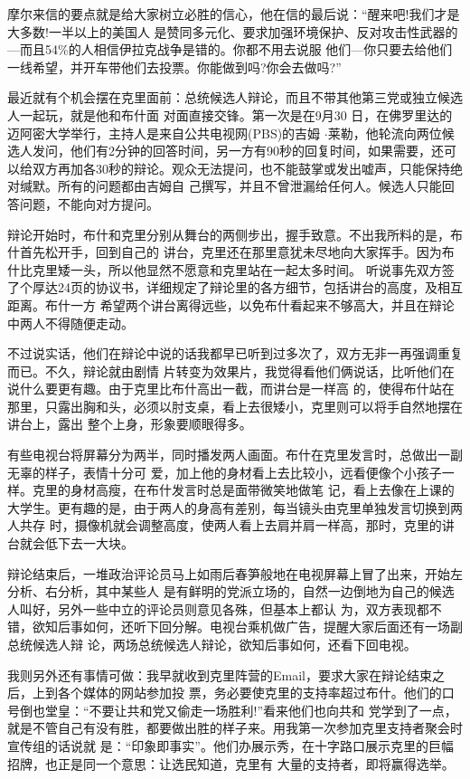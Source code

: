 ﻿\documentclass[11pt]{article}
\begin{document}
摩尔来信的要点就是给大家树立必胜的信心，他在信的最后说：``醒来吧!我们才是大多数!一半以上的美国人
是赞同多元化、要求加强环境保护、反对攻击性武器的---而且54\%的人相信伊拉克战争是错的。你都不用去说服
他们---你只要去给他们一线希望，并开车带他们去投票。你能做到吗?你会去做吗?''

最近就有个机会摆在克里面前：总统候选人辩论，而且不带其他第三党或独立候选人一起玩，就是他和布什面
对面直接交锋。第一次是在9月30 日，在佛罗里达的迈阿密大学举行，主持人是来自公共电视网(PBS)的吉姆
$\cdot$莱勒，他轮流向两位候选人发问，他们有2分钟的回答时间，另一方有90秒的回复时间，如果需要，还可
以给双方再加各30秒的辩论。观众无法提问，也不能鼓掌或发出嘘声，只能保持绝对缄默。所有的问题都由吉姆自
己撰写，并且不曾泄漏给任何人。候选人只能回答问题，不能向对方提问。

辩论开始时，布什和克里分别从舞台的两侧步出，握手致意。不出我所料的是，布什首先松开手，回到自己的
讲台，克里还在那里意犹未尽地向大家挥手。因为布什比克里矮一头，所以他显然不愿意和克里站在一起太多时间。
听说事先双方签了个厚达24页的协议书，详细规定了辩论里的各方细节，包括讲台的高度，及相互距离。布什一方
希望两个讲台离得远些，以免布什看起来不够高大，并且在辩论中两人不得随便走动。

不过说实话，他们在辩论中说的话我都早已听到过多次了，双方无非一再强调重复而已。不久，辩论就由剧情
片转变为效果片，我觉得看他们俩说话，比听他们在说什么要更有趣。由于克里比布什高出一截，而讲台是一样高
的，使得布什站在那里，只露出胸和头，必须以肘支桌，看上去很矮小，克里则可以将手自然地摆在讲台上，露出
整个上身，形象要顺眼得多。

有些电视台将屏幕分为两半，同时播发两人画面。布什在克里发言时，总做出一副无辜的样子，表情十分可
爱，加上他的身材看上去比较小，远看便像个小孩子一样。克里的身材高瘦，在布什发言时总是面带微笑地做笔
记，看上去像在上课的大学生。更有趣的是，由于两人的身高有差别，每当镜头由克里单独发言切换到两人共存
时，摄像机就会调整高度，使两人看上去肩并肩一样高，那时，克里的讲台就会低下去一大块。

辩论结束后，一堆政治评论员马上如雨后春笋般地在电视屏幕上冒了出来，开始左分析、右分析，其中某些人
是有鲜明的党派立场的，自然一边倒地为自己的候选人叫好，另外一些中立的评论员则意见各殊，但基本上都认
为，双方表现都不错，欲知后事如何，还听下回分解。电视台乘机做广告，提醒大家后面还有一场副总统候选人辩
论，两场总统候选人辩论，欲知后事如何，还看下回电视。

我则另外还有事情可做：我早就收到克里阵营的Email，要求大家在辩论结束之后，上到各个媒体的网站参加投
票，务必要使克里的支持率超过布什。他们的口号倒也堂皇：``不要让共和党又偷走一场胜利!''看来他们也向共和
党学到了一点，就是不管自己有没有胜，都要做出胜的样子来。用我第一次参加克里支持者聚会时宣传组的话说就
是：``印象即事实''。他们办展示秀，在十字路口展示克里的巨幅招牌，也正是同一个意思：让选民知道，克里有
大量的支持者，即将赢得选举。
\end{document}
